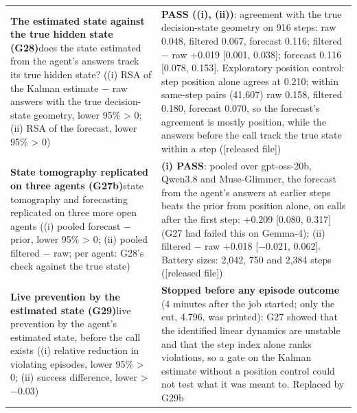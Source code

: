 {\begin{longtable}{p{}p{}}
\textbf{The estimated state against the true hidden state (G28)}\newline does the state estimated from the agent's answers track its true hidden state? ((i) RSA of the Kalman estimate $-$ raw answers with the true decision-state geometry, lower 95\% > 0; (ii) RSA of the forecast, lower 95\% > 0) & \textbf{PASS ((i), (ii))}: agreement with the true decision-state geometry on 916 steps: raw 0.048, filtered 0.067, forecast 0.116; filtered $-$ raw +0.019 [0.001, 0.038]; forecast 0.116 [0.078, 0.153]. Exploratory position control: step position alone agrees at 0.210; within same-step pairs (41,607) raw 0.158, filtered 0.180, forecast 0.070, so the forecast's agreement is mostly position, while the answers before the call track the true state within a step ([released file])\\[2pt]
\textbf{State tomography replicated on three agents (G27b)}\newline state tomography and forecasting replicated on three more open agents ((i) pooled forecast $-$ prior, lower 95\% > 0; (ii) pooled filtered $-$ raw; per agent: G28's check against the true state) & \textbf{(i) PASS}: pooled over gpt-oss-20b, Qwen3.8 and Muse-Glimmer, the forecast from the agent's answers at earlier steps beats the prior from position alone, on calls after the first step: +0.209 [0.080, 0.317] (G27 had failed this on Gemma-4); (ii) filtered $-$ raw +0.018 [$-$0.021, 0.062]. Battery sizes: 2,042, 750 and 2,384 steps ([released file])\\[2pt]
\textbf{Live prevention by the estimated state (G29)}\newline live prevention by the agent's estimated state, before the call exists ((i) relative reduction in violating episodes, lower 95\% > 0; (ii) success difference, lower > $-$0.03) & \textbf{Stopped before any episode outcome} (4 minutes after the job started; only the cut, 4.796, was printed): G27 showed that the identified linear dynamics are unstable and that the step index alone ranks violations, so a gate on the Kalman estimate without a position control could not test what it was meant to. Replaced by G29b\\[2pt]

\end{longtable}}
